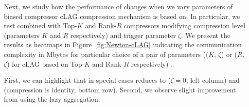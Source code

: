\documentclass[11pt]{article}
\begin{document}
	Next, we study how the performance of  changes when we vary parameters of biased compressor cLAG compression mechanism is based on. In particular, we test  combined with Top-$K$ and Rank-$R$ compressors modifying compression level (parameters $K$ and $R$ respectively) and trigger parameter $\zeta$. We present the results as heatmaps in Figure~\ref{fig:Newton-cLAG} indicating the communication complexity in Mbytes for particular choice of a pair of parameters (($K$, $\zeta$) or ($R$, $\zeta$) for cLAG based on Top-$K$ and Rank-$R$ respectively) .
	
	First, we can highlight that in special cases  reduces to  ($\zeta=0$, left column) and  (compression is identity, bottom row). Second, we observe slight improvement from using the lazy aggregation. 
	
\end{document}
